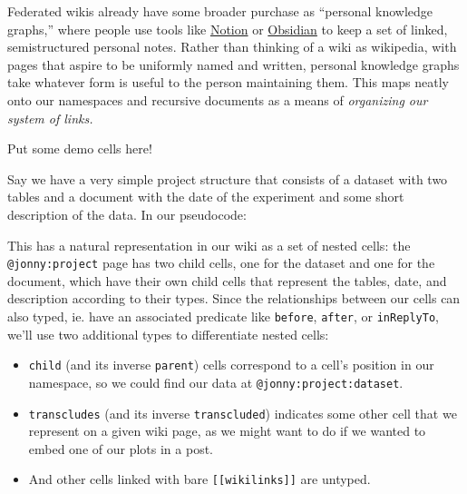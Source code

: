 Federated wikis already have some broader purchase as ``personal
knowledge graphs,'' \citep{balogPersonalKnowledgeGraphs2019} 
where people use tools like \href{https://www.notion.so/}{Notion} or
\href{https://obsidian.md/}{Obsidian} to keep a set of linked,
semistructured personal notes. Rather than thinking of a wiki as
wikipedia, with pages that aspire to be uniformly named and written,
personal knowledge graphs take whatever form is useful to the person
maintaining them. This maps neatly onto our namespaces and recursive
documents as a means of \emph{organizing our system of links.}

Put some demo cells here!

Say we have a very simple project structure that consists of a dataset
with two tables and a document with the date of the experiment and some
short description of the data. In our pseudocode:

\begin{Shaded}
\begin{Highlighting}[]



\end{Highlighting}
\end{Shaded}

This has a natural representation in our wiki as a set of nested cells:
the \texttt{@jonny:project} page has two child cells, one for the
dataset and one for the document, which have their own child cells that
represent the tables, date, and description according to their types.
Since the relationships between our cells can also typed, ie. have an
associated predicate like \texttt{before}, \texttt{after}, or
\texttt{inReplyTo}, we'll use two additional types to differentiate
nested cells:

\begin{itemize}

\item
  \texttt{child} (and its inverse \texttt{parent}) cells correspond to a
  cell's position in our namespace, so we could find our data at
  \texttt{@jonny:project:dataset}.
\item
  \texttt{transcludes} (and its inverse \texttt{transcluded}) indicates
  some other cell that we represent on a given wiki page, as we might
  want to do if we wanted to embed one of our plots in a post.
\item
  And other cells linked with bare \texttt{{[}{[}wikilinks{]}{]}} are
  untyped.
\end{itemize}

